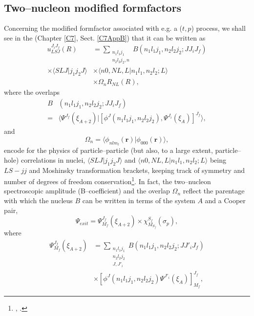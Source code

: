 \subsection{Two--nucleon modified formfactors}\label{S2.1.1}
Concerning the modified formfactor associated with e.g. a ($t,p$) process, we shall see in the (Chapter \ref{C7}, Sect. \ref{C7AppB}) that it can be written as
\begin{equation}\label{eq1.1.1}
\begin{split}
u_{LSJ}^{J_iJ_f}(R)&=\sum_{\substack{n_1l_1j_1\\n_2l_2j_2,n}}B(n_1l_1j_1,n_2l_2j_2;JJ_iJ_f)\\
\times\langle SLJ|j_1j_2J\rangle &\times \langle n0, NL,L|n_1l_1,n_2l_2;L\rangle\\
&\times\Omega_n R_{NL}(R),
\end{split}
\end{equation}
where the overlaps
\begin{equation}\label{eq2C2.1}
\begin{split}
B&(n_1l_1j_1,n_2l_2j_2;JJ_iJ_f)\\
=&\langle \Psi^{J_f}(\xi_{A+2})|\left[\phi^J(n_1l_1j_1,n_2l_2j_2),\Psi^{J_i}(\xi_A)\right]^{J_f}\rangle,
\end{split}
\end{equation}
and 
\begin{equation}\label{eq1.1.3}
\Omega_n=\langle \phi_{nlm_l}(\mathbf r)|\phi_{000}(\mathbf r)\rangle,
\end{equation}
encode for the physics of particle--particle (but also, to a large extent, particle--hole) correlations in nuclei, $\langle SLJ|j_1j_2J\rangle$ and $\langle n0,NL,L|n_1 l_1,n_2l_2;L\rangle$ being $LS-jj$ and Moshinsky transformation brackets, keeping track of symmetry and number of degrees of freedom conservation\footnote{\cite{Glendenning:65}, \cite{Broglia:73}.}. In fact, the two--nucleon spectroscopic amplitude (B--coefficient) and the overlap $\Omega_n$ reflect the parentage with which the nucleus $B$ can be written in terms of the system $A$ and a Cooper pair,
\begin{equation}
\Psi_{exit}=\Psi_{M_f}^{J_f}(\xi_{A+2})\times\chi^{S_f}_{M_{S_f}}(\sigma_p),
\end{equation}
where
\begin{equation}
\begin{split}
\Psi_{M_f}^{J_f}(\xi_{A+2})&=\sum_{\substack{n_1l_1j_1\\n_2l_2j_2\\J,J'_i}}B(n_1l_1j_1,n_2l_2j_2;JJ'_iJ_f)\\
&\times\left[\phi^J(n_1l_1j_1,n_2l_2j_2)\Psi^{J'_i}(\xi_A)\right]_{M_f}^{J_f},
\end{split}
\end{equation}
